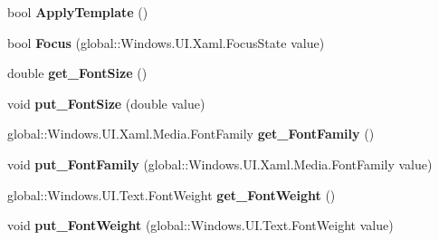 \begin{DoxyCompactItemize}
bool {\bfseries Apply\+Template} ()
\item 
\mbox{\label{interface_windows_1_1_u_i_1_1_xaml_1_1_controls_1_1_i_control_a7c98017d582493146cd685fc022b8bcb}} 
bool {\bfseries Focus} (global\+::\+Windows.\+U\+I.\+Xaml.\+Focus\+State value)
\item 
\mbox{\label{interface_windows_1_1_u_i_1_1_xaml_1_1_controls_1_1_i_control_a9388b2d1fe635f428cae07d67c0a8aaf}} 
double {\bfseries get\+\_\+\+Font\+Size} ()
\item 
\mbox{\label{interface_windows_1_1_u_i_1_1_xaml_1_1_controls_1_1_i_control_a34a055aa84a0508191429e20453c5ce0}} 
void {\bfseries put\+\_\+\+Font\+Size} (double value)
\item 
\mbox{\label{interface_windows_1_1_u_i_1_1_xaml_1_1_controls_1_1_i_control_a689d7b84c03cb8baa86aef968c2f78e5}} 
global\+::\+Windows.\+U\+I.\+Xaml.\+Media.\+Font\+Family {\bfseries get\+\_\+\+Font\+Family} ()
\item 
\mbox{\label{interface_windows_1_1_u_i_1_1_xaml_1_1_controls_1_1_i_control_a9026d2ca28dbe0834360260903186536}} 
void {\bfseries put\+\_\+\+Font\+Family} (global\+::\+Windows.\+U\+I.\+Xaml.\+Media.\+Font\+Family value)
\item 
\mbox{\label{interface_windows_1_1_u_i_1_1_xaml_1_1_controls_1_1_i_control_a72747904d83bab3de0891c213aa46602}} 
global\+::\+Windows.\+U\+I.\+Text.\+Font\+Weight {\bfseries get\+\_\+\+Font\+Weight} ()
\item 
\mbox{\label{interface_windows_1_1_u_i_1_1_xaml_1_1_controls_1_1_i_control_a50f45e373b66a5b092b6464b5dbd94bf}} 
void {\bfseries put\+\_\+\+Font\+Weight} (global\+::\+Windows.\+U\+I.\+Text.\+Font\+Weight value)
\item 
\mbox{\label{interface_windows_1_1_u_i_1_1_xaml_1_1_controls_1_1_i_control_a3e1d85a4f0fe3ee8c4cff3ce4f34a651}} 

\end{DoxyCompactItemize}
